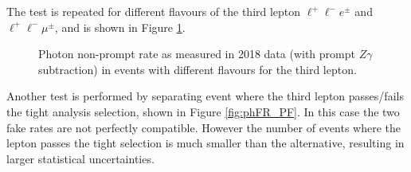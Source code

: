 The test is repeated for different flavours of the third lepton $\ell^+ \ell^- e^\pm$ and $\ell^+ \ell^- \mu^\pm$, and is shown in Figure \ref{fig:phFR_em}.

\begin{figure}
%
\caption{Photon non-prompt rate as measured in 2018 data (with prompt $Z\gamma$ subtraction) in events with different flavours for the third lepton.}
\label{fig:phFR_em}
\end{figure}

Another test is performed by separating event where the third lepton passes/fails the tight analysis selection, shown in Figure \ref{fig:phFR_PF}.
In this case the two fake rates are not perfectly compatible.
However the number of events where the lepton passes the tight selection is
much smaller than the alternative, resulting in larger statistical uncertainties.

